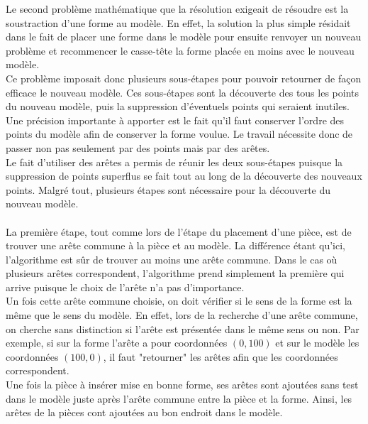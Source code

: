\documentclass[a4paper, 11pt]{report}
\begin{document}
		Le second problème mathématique que la résolution exigeait de résoudre est la soustraction d'une forme au modèle. En effet, la solution la plus simple résidait dans le fait de placer une forme dans le modèle pour ensuite renvoyer un nouveau problème et recommencer le casse-t\^ete la forme placée en moins avec le nouveau modèle.\\
		Ce problème imposait donc plusieurs sous-étapes pour pouvoir retourner de façon efficace le nouveau modèle. Ces sous-étapes sont la découverte des tous les points du nouveau modèle, puis la suppression d'éventuels points qui seraient inutiles. Une précision importante à apporter est le fait qu'il faut conserver l'ordre des points du modèle afin de conserver la forme voulue. Le travail nécessite donc de passer non pas seulement par des points mais par des arêtes.\\
		Le fait d'utiliser des arêtes a permis de réunir les deux sous-étapes puisque la suppression de points superflus se fait tout au long de la découverte des nouveaux points. Malgré tout, plusieurs étapes sont nécessaire pour la découverte du nouveau modèle.\\ \ \\
		La première étape, tout comme lors de l'étape du placement d'une pièce, est de trouver une arête commune à la pièce et au modèle. La différence étant qu'ici, l'algorithme est sûr de trouver au moins une arête commune. Dans le cas où plusieurs arêtes correspondent, l'algorithme prend simplement la première qui arrive puisque le choix de l'arête n'a pas d'importance.\\
		Un fois cette arête commune choisie, on doit vérifier si le sens de la forme est la même que le sens du modèle. En effet, lors de la recherche d'une arête commune, on cherche sans distinction si l'arête est présentée dans le même sens ou non. Par exemple, si sur la forme l'arête a pour coordonnées $(0,100)$ et sur le modèle les coordonnées $(100,0)$, il faut "retourner" les arêtes afin que les coordonnées correspondent.\\
		Une fois la pièce à insérer mise en bonne forme, ses arêtes sont ajoutées sans test dans le modèle juste après l'arête commune entre la pièce et la forme. Ainsi, les arêtes de la pièces cont ajoutées au bon endroit dans le modèle.\\
		
\end{document}
